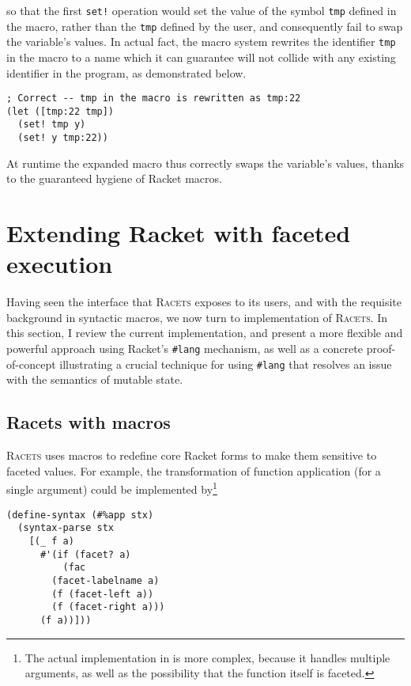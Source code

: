 \documentclass{article}
\begin{document}
\noindent so that the first \texttt{set!} operation would set the value of the symbol \texttt{tmp} defined in the macro, rather than the \texttt{tmp} defined by the user, and consequently fail to swap the variable's values. In actual fact, the macro system rewrites the identifier \texttt{tmp} in the macro to a name which it can guarantee will not collide with any existing identifier in the program, as demonstrated below.

\begin{lstlisting}
; Correct -- tmp in the macro is rewritten as tmp:22
(let ([tmp:22 tmp])
  (set! tmp y)
  (set! y tmp:22))
\end{lstlisting}

At runtime the expanded macro thus correctly swaps the variable's values, thanks to the guaranteed hygiene of Racket macros.



\section{Extending Racket with faceted execution\label{sec:lang}}
Having seen the interface that \textsc{Racets} exposes to its users, and with the requisite background in syntactic macros, we now turn to implementation of \textsc{Racets}. In this section, I review the current implementation, and present a more flexible and powerful approach using Racket's \texttt{\#lang} mechanism, as well as a concrete proof-of-concept illustrating a crucial technique for using \texttt{\#lang} that resolves an issue with the semantics of mutable state.


\subsection{Racets with macros}
\textsc{Racets} uses macros to redefine core Racket forms to make them sensitive to faceted values. For example, the transformation of function application (for a single argument) could be implemented by\footnote{The actual implementation in \cite{racets} is more complex, because it handles multiple arguments, as well as the possibility that the function itself is faceted.}

\begin{lstlisting}
(define-syntax (#%app stx)
  (syntax-parse stx
    [(_ f a)
      #'(if (facet? a)
          (fac
	    (facet-labelname a)
	    (f (facet-left a))
	    (f (facet-right a)))
	  (f a))]))
\end{lstlisting}
\end{document}
